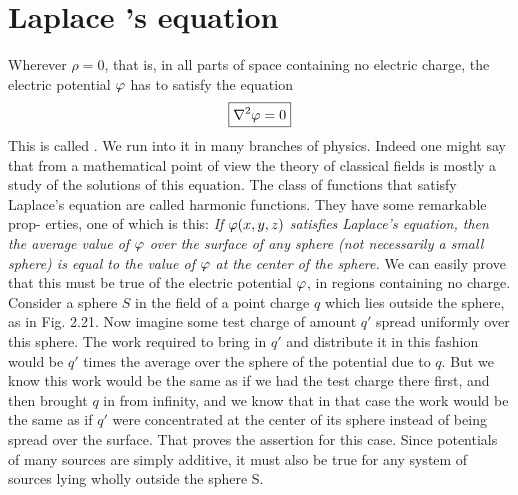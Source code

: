 \section{Laplace 's equation}

Wherever $\rho = 0$, that is, in all parts of space containing no electric
charge, the electric potential $\varphi$ has to satisfy the equation
\begin{equation}
\boxed{
  \nabla^2\varphi=0
}
\end{equation}
This is called . We run into it in many branches
of physics. Indeed one might say that from a mathematical point of
view the theory of classical fields is mostly a study of the solutions of
this equation. The class of functions that satisfy Laplace's equation
are called harmonic functions. They have some remarkable prop-
erties, one of which is this: \emph{If $\varphi(x,y,z)$ satisfies Laplace's equation,
then the average value of $\varphi$ over the surface of any sphere (not necessarily
a small sphere) is equal to the value of $\varphi$ at the center of the
sphere.} We can easily prove that this must be true of the electric
potential $\varphi$, in regions containing no charge. Consider a sphere $S$
in the field of a point charge $q$ which lies outside the sphere, as in
Fig. 2.21. Now imagine some test charge of amount $q'$ spread uniformly
over this sphere. The work required to bring in $q'$ and distribute
it in this fashion would be $q'$ times the average over the sphere
of the potential due to $q$. But we know this work would be the same
as if we had the test charge there first, and then brought $q$ in from
infinity, and we know that in that case the work would be the same as
if $q'$ were concentrated at the center of its sphere instead of being
spread over the surface. That proves the assertion for this case.
Since potentials of many sources are simply additive, it must also be
true for any system of sources lying wholly outside the sphere S.

